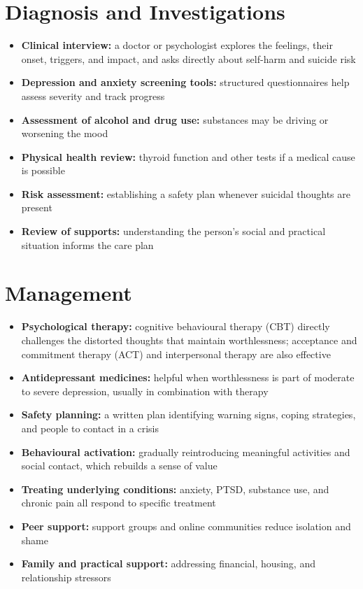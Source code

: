 \section*{Diagnosis and Investigations}
\begin{itemize}
    \item \textbf{Clinical interview:} a doctor or psychologist explores the feelings, their onset, triggers, and impact, and asks directly about self-harm and suicide risk
    \item \textbf{Depression and anxiety screening tools:} structured questionnaires help assess severity and track progress
    \item \textbf{Assessment of alcohol and drug use:} substances may be driving or worsening the mood
    \item \textbf{Physical health review:} thyroid function and other tests if a medical cause is possible
    \item \textbf{Risk assessment:} establishing a safety plan whenever suicidal thoughts are present
    \item \textbf{Review of supports:} understanding the person's social and practical situation informs the care plan
\end{itemize}

\section*{Management}
\begin{itemize}
    \item \textbf{Psychological therapy:} cognitive behavioural therapy (CBT) directly challenges the distorted thoughts that maintain worthlessness; acceptance and commitment therapy (ACT) and interpersonal therapy are also effective
    \item \textbf{Antidepressant medicines:} helpful when worthlessness is part of moderate to severe depression, usually in combination with therapy
    \item \textbf{Safety planning:} a written plan identifying warning signs, coping strategies, and people to contact in a crisis
    \item \textbf{Behavioural activation:} gradually reintroducing meaningful activities and social contact, which rebuilds a sense of value
    \item \textbf{Treating underlying conditions:} anxiety, PTSD, substance use, and chronic pain all respond to specific treatment
    \item \textbf{Peer support:} support groups and online communities reduce isolation and shame
    \item \textbf{Family and practical support:} addressing financial, housing, and relationship stressors
\end{itemize}

